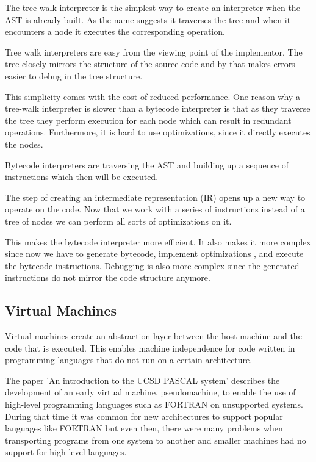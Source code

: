 \documentclass{article}
\begin{document}
The tree walk interpreter is the simplest way to create an interpreter when the
AST is already built. As the name suggests it traverses the tree and when it
encounters a node it executes the corresponding operation.

Tree walk interpreters are easy from the viewing point of the implementor. The
tree closely mirrors the structure of the source code and by that makes errors
easier to debug in the tree structure.

This simplicity comes with the cost of reduced performance. One reason why a
tree-walk interpreter is slower than a bytecode interpreter is that as they
traverse the tree they perform execution for each node which can result in
redundant operations. Furthermore, it is hard to use optimizations, since
it directly executes the nodes.

Bytecode interpreters are traversing the AST and building up a sequence of 
instructions which then will be executed. 

The step of creating an intermediate representation (IR) opens up a new way to
operate on the code. Now that we work with a series of instructions instead of
a tree of nodes we can perform all sorts of optimizations on it.

This makes the bytecode interpreter more efficient. It also makes it more
complex since now we have to generate bytecode, implement optimizations
, and execute the bytecode instructions. Debugging is also more complex since
the generated instructions do not mirror the code structure anymore.

\subsection{Virtual Machines}
Virtual machines create an abstraction layer between the host machine and 
the code that is executed. This enables machine independence for code
written in programming languages that do not run on a certain architecture.

The paper 'An introduction to the UCSD PASCAL system' describes the development
of an early virtual machine, pseudomachine, to enable the use of high-level
programming languages such as FORTRAN on unsupported systems. During that time
it was common for new architectures to support popular languages like FORTRAN
but even then, there were many problems when transporting programs from one
system to another and smaller machines had no support for high-level languages.
~\cite{pascal}
\end{document}
